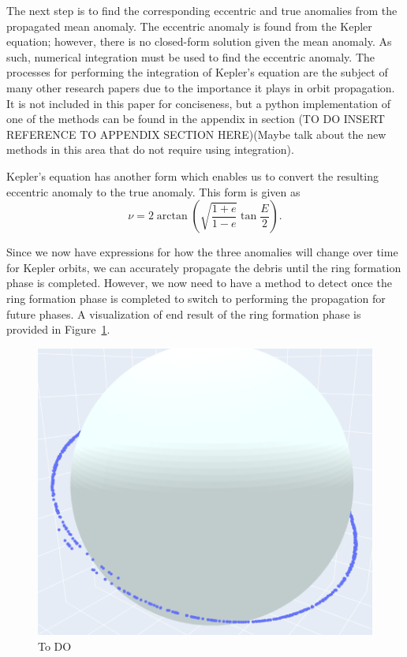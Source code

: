 \documentclass[a4paper, 12pt]{article}
\begin{document}
The next step is to find the corresponding eccentric and true anomalies from the propagated mean anomaly. The eccentric anomaly is found from the Kepler equation; however, there is no closed-form solution given the mean anomaly. As such, numerical integration must be used to find the eccentric anomaly. The processes for performing the integration of Kepler's equation are the subject of many other research papers due to the importance it plays in orbit propagation. It is not included in this paper for conciseness, but a python implementation of one of the methods can be found in the appendix in section (TO DO INSERT REFERENCE TO APPENDIX SECTION HERE)(Maybe talk about the new methods in this area that do not require using integration).

Kepler's equation has another form which enables us to convert the resulting eccentric anomaly to the true anomaly. This form is given as
\begin{equation}
	\nu = 2 \arctan\left(\sqrt{\frac{1+e}{1-e}}\tan\frac{E}{2}\right).
\end{equation}

Since we now have expressions for how the three anomalies will change over time for Kepler orbits, we can accurately propagate the debris until the ring formation phase is completed. However, we now need to have a method to detect once the ring formation phase is completed to switch to performing the propagation for future phases. A visualization of end result of the ring formation phase is provided in Figure~\ref{ring}.
\begin{figure}[b!]
	\centering
	\includegraphics[scale=0.45]{ring_phase}
	\caption{To DO }
	\label{ring}
\end{figure}
\end{document}
